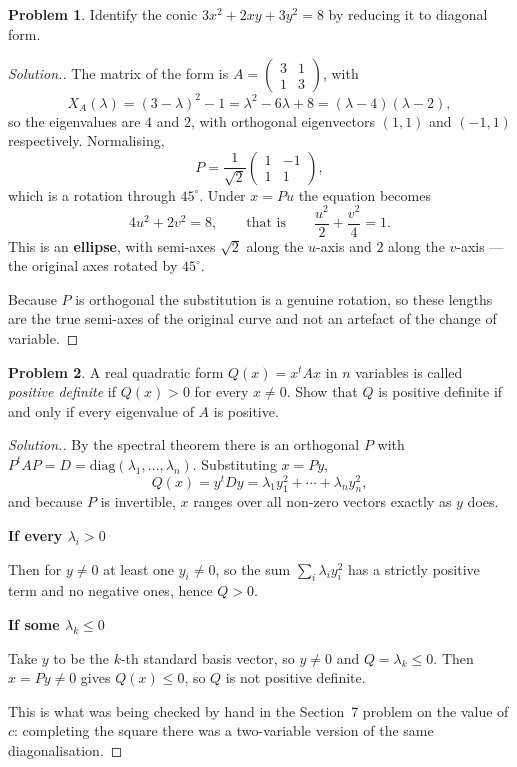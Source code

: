 \documentclass[11pt,a4paper]{article}
\theoremstyle{definition}
\newtheorem{problemx}{Problem}[section]
\newenvironment{problem}{\begin{problemx}}{\end{problemx}}
\newenvironment{solution}
  {\renewcommand{\qedsymbol}{}\begin{proof}[\textit{Solution}.]}
  {\end{proof}}
\newcommand{\subhead}[1]{%
  \par\medskip\noindent\textbf{#1}\par\nobreak\smallskip}
\begin{document}
\begin{problem}
Identify the conic $3x^2+2xy+3y^2=8$ by reducing it to diagonal form.
\end{problem}
\begin{solution}
The matrix of the form is
$A=\begin{pmatrix}3&1\\1&3\end{pmatrix}$, with
$$X_A(\lambda)=(3-\lambda)^2-1=\lambda^2-6\lambda+8=(\lambda-4)(\lambda-2),$$
so the eigenvalues are $4$ and $2$, with orthogonal eigenvectors $(1,1)$ and
$(-1,1)$ respectively. Normalising,
$$P=\frac{1}{\sqrt2}\begin{pmatrix}1&-1\\1&1\end{pmatrix},$$
which is a rotation through $45^{\circ}$. Under $x=Pu$ the equation becomes
$$4u^2+2v^2=8,\qquad\text{that is}\qquad \frac{u^2}{2}+\frac{v^2}{4}=1.$$
This is an \textbf{ellipse}, with semi-axes $\sqrt2$ along the $u$-axis and
$2$ along the $v$-axis --- the original axes rotated by $45^{\circ}$.

Because $P$ is orthogonal the substitution is a genuine rotation, so these
lengths are the true semi-axes of the original curve and not an artefact of the
change of variable.
\end{solution}

\begin{problem}
A real quadratic form $Q(x)=x^tAx$ in $n$ variables is called \emph{positive
definite} if $Q(x)>0$ for every $x\neq 0$. Show that $Q$ is positive definite
if and only if every eigenvalue of $A$ is positive.
\end{problem}
\begin{solution}
By the spectral theorem there is an orthogonal $P$ with
$P^tAP=D=\text{diag}(\lambda_1,\dots,\lambda_n)$. Substituting $x=Py$,
$$Q(x)=y^tDy=\lambda_1y_1^2+\cdots+\lambda_ny_n^2,$$
and because $P$ is invertible, $x$ ranges over all non-zero vectors exactly as
$y$ does.

\subhead{If every $\lambda_i>0$}
Then for $y\neq 0$ at least one $y_i\neq 0$, so the sum
$\sum_i\lambda_iy_i^2$ has a strictly positive term and no negative ones, hence
$Q>0$.

\subhead{If some $\lambda_k\leq 0$}
Take $y$ to be the $k$-th standard basis vector, so $y\neq 0$ and
$Q=\lambda_k\leq 0$. Then $x=Py\neq 0$ gives $Q(x)\leq 0$, so $Q$ is not
positive definite.

This is what was being checked by hand in the Section~7 problem on the value of
$c$: completing the square there was a two-variable version of the same
diagonalisation.
\end{solution}
\end{document}

